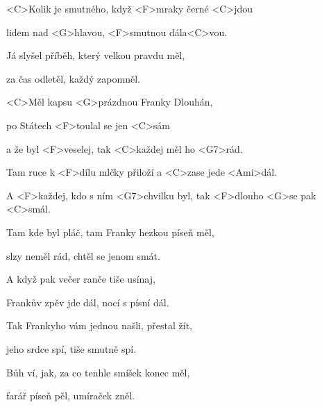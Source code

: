 

\zs
<C>Kolik je smutného,
když <F>mraky černé <C>jdou

lidem nad <G>hlavou, <F>smutnou dála<C>vou.

Já slyšel příběh, který velkou pravdu měl,

za čas odletěl, každý zapomněl.
\ks

\zr
<C>Měl kapsu <G>prázdnou Franky Dlouhán,

po Státech <F>toulal se jen <C>sám

a že byl <F>veselej, tak <C>každej měl ho <G7>rád.

Tam ruce k <F>dílu mlčky přiloží
a <C>zase
jede <Ami>dál.

A <F>každej, kdo s ním
<G7>chvilku byl, tak <F>dlouho <G>se pak <C>smál.
\kr

\zs
Tam kde byl pláč, tam Franky hezkou píseň měl,

slzy neměl rád, chtěl se jenom smát.

A když pak večer ranče tiše usínaj,

Frankův zpěv jde dál, nocí s písní dál.
\ks

\zr \kr

\zs
Tak Frankyho vám jednou našli, přestal žít,

jeho srdce spí, tiše smutně spí.

Bůh ví, jak, za co tenhle smíšek konec měl,

farář píseň pěl, umíraček zněl.
\ks

\zr\kr

\kp
